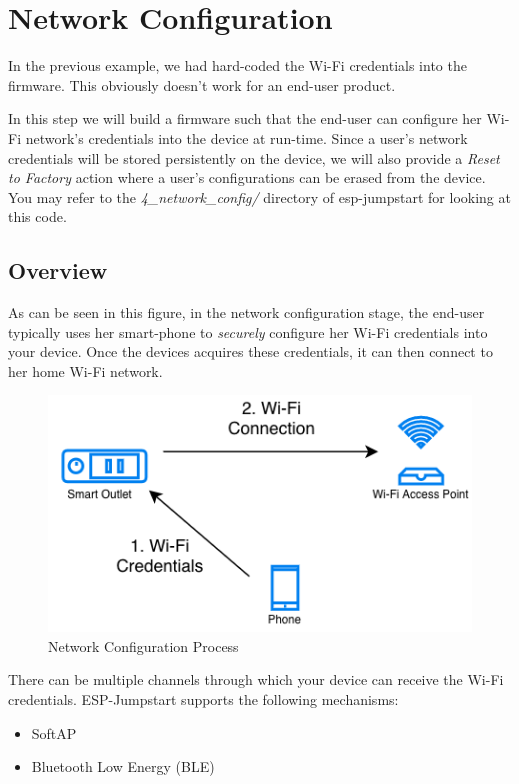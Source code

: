 \documentclass[main.tex]{subfiles}
\begin{document}
\chapter{Network Configuration}

In the previous example, we had hard-coded the Wi-Fi credentials into the firmware. This obviously doesn't work for an end-user product.

In this step we will build a firmware such that the end-user can configure her Wi-Fi network's credentials into the device at run-time. Since a user's network credentials will be stored persistently on the device, we will also provide a \textit{Reset to Factory} action where a user's configurations can be erased from the device.
You may refer to the \textit{4\_network\_config/} directory of esp-jumpstart for looking at this code.

\section{Overview}
As can be seen in this figure, in the network configuration stage, the end-user typically uses her smart-phone to \textit{securely} configure her Wi-Fi credentials into your device. Once the devices acquires these credentials, it can then connect to her home Wi-Fi network. 

\begin{figure}
    \centering
    \includegraphics[scale=0.4]{../../_static/network_config.png}
    \caption{Network Configuration Process}
    \label{fig:network_config}
\end{figure}

There can be multiple channels through which your device can receive the Wi-Fi credentials. ESP-Jumpstart supports the following mechanisms:

\begin{itemize}
    \item SoftAP 
    \item Bluetooth Low Energy (BLE)
\end{itemize}
\end{document}
